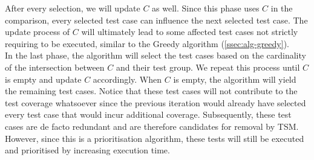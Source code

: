 After every selection, we will update $C$ as well. Since this phase uses $C$ in the comparison, every selected test case can influence the next selected test case. The update process of $C$ will ultimately lead to some affected test cases not strictly requiring to be executed, similar to the Greedy algorithm (\cref{ssec:alg-greedy}).\\

\noindent In the last phase, the algorithm will select the test cases based on the cardinality of the intersection between $C$ and their test group. We repeat this process until $C$ is empty and update $C$ accordingly. When $C$ is empty, the algorithm will yield the remaining test cases. Notice that these test cases will not contribute to the test coverage whatsoever since the previous iteration would already have selected every test case that would incur additional coverage. Subsequently, these test cases are de facto redundant and are therefore candidates for removal by TSM. However, since this is a prioritisation algorithm, these tests will still be executed and prioritised by increasing execution time.

